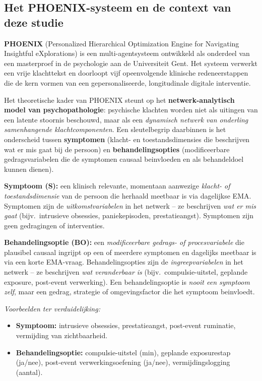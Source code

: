 \documentclass[11pt,a4paper]{article}
\begin{document}
\subsection*{Het PHOENIX-systeem en de context van deze studie}

\textbf{PHOENIX} (Personalized Hierarchical Optimization Engine for Navigating
Insightful eXplorations) is een multi-agentsysteem ontwikkeld als onderdeel van
een masterproef in de psychologie aan de Universiteit Gent. Het systeem verwerkt
een vrije klachttekst en doorloopt vijf opeenvolgende klinische redeneerstappen
die de kern vormen van een gepersonaliseerde, longitudinale digitale interventie.

Het theoretische kader van PHOENIX steunt op het \textbf{netwerk-analytisch model
van psychopathologie}: psychische klachten worden niet
als uitingen van een latente stoornis beschouwd, maar als een \emph{dynamisch
netwerk van onderling samenhangende klachtcomponenten}. Een sleutelbegrip daarbinnen
is het onderscheid tussen \textbf{symptomen} (klacht- en toestandsdimensies die
beschrijven wat er mis gaat bij de persoon) en \textbf{behandelingsopties}
(modificeerbare gedragsvariabelen die de symptomen causaal beinvloeden en als
behandeldoel kunnen dienen).

\vspace{0.4em}
\begin{instrbox}[title={Kerndefinities: symptoom versus behandelingsoptie}]
\small
\textbf{Symptoom (S):} een klinisch relevante, momentaan aanwezige
\emph{klacht- of toestandsdimensie} van de persoon die herhaald meetbaar is via
dagelijkse EMA. Symptomen zijn de \emph{uitkomstvariabelen} in het netwerk -- ze
beschrijven \emph{wat er mis gaat} (bijv.\ intrusieve obsessies, paniekepisoden,
prestatieangst). Symptomen zijn geen gedragingen of interventies.

\medskip
\textbf{Behandelingsoptie (BO):} een \emph{modificeerbare gedrags- of procesvariabele}
die plausibel causaal ingrijpt op een of meerdere symptomen en dagelijks meetbaar
is via een korte EMA-vraag. Behandelingsopties zijn de \emph{ingreepvariabelen} in het
netwerk -- ze beschrijven \emph{wat veranderbaar is} (bijv.\ compulsie-uitstel,
geplande exposure, post-event verwerking). Een behandelingsoptie is \emph{nooit een symptoom zelf},
maar een gedrag, strategie of omgevingsfactor die het symptoom beinvloedt.

\medskip\small
\textit{Voorbeelden ter verduidelijking:}
\begin{itemize}[topsep=1pt,itemsep=0pt]
\item \textbf{Symptoom:} intrusieve obsessies, prestatieangst, post-event ruminatie, vermijding van zichtbaarheid.
\item \textbf{Behandelingsoptie:} compulsie-uitstel (min), geplande exposurestap (ja/nee),
post-event verwerkingsoefening (ja/nee), vermijdingslogging (aantal).
\end{itemize}
\end{instrbox}
\end{document}
